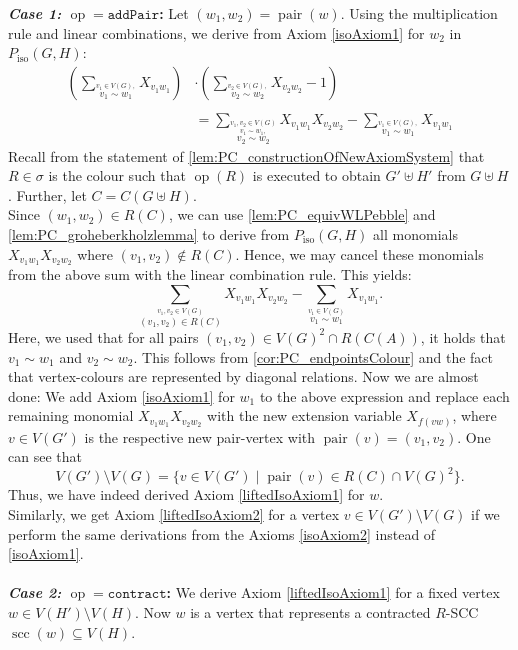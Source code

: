\documentclass[a4paper,UKenglish,cleveref, autoref, thm-restate]{lipics-v2021}
\newcommand{\pairOp }{\texttt{addPair}}
\newcommand{\sccOp }{\texttt{contract}}
\newcommand{\op}{\operatorname{op}}
\newcommand{\scc}{{\operatorname{scc}}}
\newcommand{\pair}{{\operatorname{pair}}}
\newcommand{\Piso}{P_{\text{iso}}}
\begin{document}
	\textbf{\textit{Case 1:} $\op = \pairOp$:}
	Let $(w_1,w_2) = \pair(w)$. Using the multiplication rule and linear combinations, we derive from Axiom \eqref{isoAxiom1} for $w_2$ in $\Piso(G,H)$: 
	\begin{align*}
		\left(\sum\limits_{\stackrel{v_1 \in V(G),}{v_1 \sim w_1}} X_{v_1w_1}\right) &\cdot \left(\sum\limits_{\stackrel{v_2 \in V(G),}{v_2 \sim w_2}} X_{v_2w_2} - 1 \right)\\
		\\
		&=\sum\limits_{\stackrel{v_1,v_2 \in V(G)}{\stackrel{v_1 \sim w_1,}{v_2 \sim w_2}}} X_{v_1w_1}X_{v_2w_2} - \sum\limits_{\stackrel{v_1 \in V(G),}{v_1 \sim w_1}} X_{v_1w_1}
	\end{align*}
	Recall from the statement of \autoref{lem:PC_constructionOfNewAxiomSystem} that $R \in \sigma$ is the colour such that $\op(R)$ is executed to obtain $G' \uplus H'$ from $G \uplus H$. Further, let $C = C(G \uplus H)$.\\
	Since $(w_1,w_2) \in R(C)$, we can use \autoref{lem:PC_equivWLPebble} and \autoref{lem:PC_groheberkholzlemma} to derive from $\Piso(G,H)$ all monomials $X_{v_1w_1}X_{v_2w_2}$ where $(v_1,v_2) \notin R(C)$. Hence, we may cancel these monomials from the above sum with the linear combination rule. This yields:
	\[
	\sum\limits_{\stackrel{v_1,v_2 \in V(G)}{(v_1,v_2) \in R(C) }} X_{v_1w_1}X_{v_2w_2} - \sum\limits_{\stackrel{v_1 \in V(G)}{v_1 \sim w_1}} X_{v_1w_1}.
	\]
	Here, we used that for all pairs $(v_1,v_2) \in V(G)^2 \cap R(C(A))$, it holds that $v_1 \sim w_1$ and $v_2 \sim w_2$. This follows from \autoref{cor:PC_endpointsColour} and the fact that vertex-colours are represented by diagonal relations. Now we are almost done: We add Axiom \eqref{isoAxiom1} for $w_1$ to the above expression and replace each remaining monomial $X_{v_1w_1}X_{v_2w_2}$ with the new extension variable $X_{f(vw)}$, where $v \in V(G')$ is the respective new pair-vertex with $\pair(v) = (v_1,v_2)$. One can see that
	\[
	V(G') \setminus V(G) = \{  v \in V(G') \mid \pair(v) \in R(C) \cap V(G)^2   \}.
	\]
	Thus, we have indeed derived Axiom \eqref{liftedIsoAxiom1} for $w$.\\
	Similarly, we get Axiom \eqref{liftedIsoAxiom2} for a vertex $v \in V(G') \setminus V(G)$ if we perform the same derivations from the Axioms \eqref{isoAxiom2} instead of \eqref{isoAxiom1}.\\
	\\
	\textbf{\textit{Case 2:} $\op = \sccOp$:}
	We derive Axiom \eqref{liftedIsoAxiom1} for a fixed vertex $w \in V(H') \setminus V(H)$. Now $w$ is a vertex that represents a contracted $R$-SCC $\scc(w) \subseteq V(H)$.
	
\end{document}
